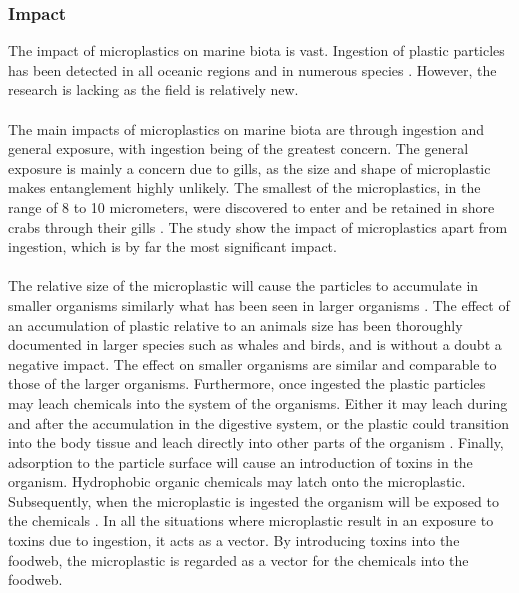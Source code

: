 \subsubsection{Impact}
The impact of microplastics on marine biota is vast. Ingestion of plastic particles has been detected in all oceanic regions and in numerous species \citep{OluniyiSolomon2016MicroplasticsSolutions}. However, the research is lacking as the field is relatively new. 
\\
\\
The main impacts of microplastics on marine biota are through ingestion and general exposure, with ingestion being of the greatest concern. The general exposure is mainly a concern due to gills, as the size and shape of microplastic makes entanglement highly unlikely. The smallest of the microplastics, in the range of 8 to 10 micrometers, were discovered to enter and be retained in shore crabs through their gills \citep{Watts2014UptakeMaenas}. The study show the impact of microplastics apart from ingestion, which is by far the most significant impact. 
\\
\\
 The relative size of the microplastic will cause the particles to accumulate in smaller organisms similarly what has been seen in larger organisms \citep{Browne2007MicroplasticanConcern}. The effect of an accumulation of plastic relative to an animals size has been thoroughly documented in larger species such as whales and birds, and is without a doubt a negative impact. The effect on smaller organisms are similar and comparable to those of the larger organisms. Furthermore, once ingested the plastic particles may leach chemicals into the system of the organisms. Either it may leach during and after the accumulation in the digestive system, or the plastic could transition into the body tissue \citep{Hussain2001RecentLymphatics} and leach directly into other parts of the organism \citep{Gallo2018MarineMeasures}. Finally, adsorption to the particle surface will cause an introduction of toxins in the organism. Hydrophobic organic chemicals may latch onto the microplastic. Subsequently, when the microplastic is ingested the organism will be exposed to the chemicals \citep{ZiccardiMicroplasticsReview}. In all the situations where microplastic result in an exposure to toxins due to ingestion, it acts as a vector. By introducing toxins into the foodweb, the microplastic is regarded as a vector for the chemicals into the foodweb.

